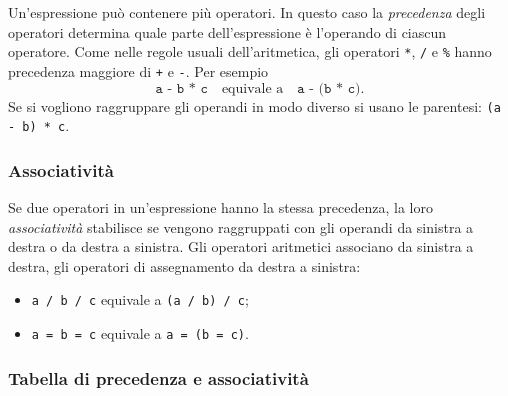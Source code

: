 \documentclass[11pt,a4paper]{article}
\begin{document}
Un'espressione può contenere più operatori. In questo caso la \emph{precedenza} degli operatori determina quale parte dell'espressione è l'operando di ciascun operatore. Come nelle regole usuali dell'aritmetica, gli operatori \lstinline|*|, \lstinline|/| e \lstinline|%| hanno precedenza maggiore di \lstinline|+| e \lstinline|-|. Per esempio
\[
\texttt{a - b * c}\quad\text{equivale a}\quad\texttt{a - (b * c)}.
\]
Se si vogliono raggruppare gli operandi in modo diverso si usano le parentesi: \lstinline|(a - b) * c|.

\subsubsection{Associatività}

Se due operatori in un'espressione hanno la stessa precedenza, la loro \emph{associatività} stabilisce se vengono raggruppati con gli operandi da sinistra a destra o da destra a sinistra. Gli operatori aritmetici associano da sinistra a destra, gli operatori di assegnamento da destra a sinistra:
\begin{itemize}
    \item \lstinline|a / b / c| equivale a \lstinline|(a / b) / c|;
    \item \lstinline|a = b = c| equivale a \lstinline|a = (b = c)|.
\end{itemize}

\subsubsection{Tabella di precedenza e associatività}
\end{document}
